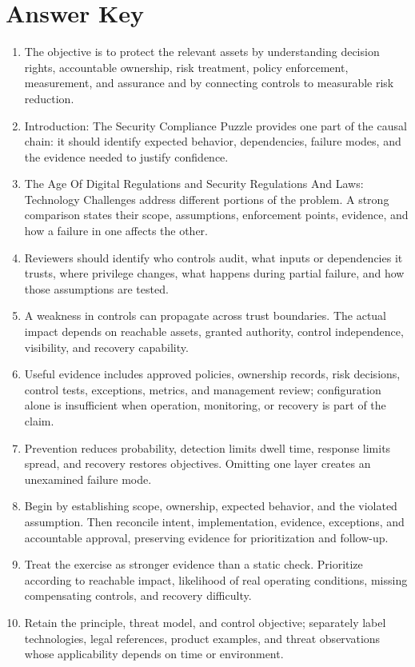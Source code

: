 \documentclass[11pt,letterpaper]{article}
\begin{document}
\section*{Answer Key}
\begin{enumerate}
\item The objective is to protect the relevant assets by understanding decision rights, accountable ownership, risk treatment, policy enforcement, measurement, and assurance and by connecting controls to measurable risk reduction.
\item Introduction: The Security Compliance Puzzle provides one part of the causal chain: it should identify expected behavior, dependencies, failure modes, and the evidence needed to justify confidence.
\item The Age Of Digital Regulations and Security Regulations And Laws: Technology Challenges address different portions of the problem. A strong comparison states their scope, assumptions, enforcement points, evidence, and how a failure in one affects the other.
\item Reviewers should identify who controls audit, what inputs or dependencies it trusts, where privilege changes, what happens during partial failure, and how those assumptions are tested.
\item A weakness in controls can propagate across trust boundaries. The actual impact depends on reachable assets, granted authority, control independence, visibility, and recovery capability.
\item Useful evidence includes approved policies, ownership records, risk decisions, control tests, exceptions, metrics, and management review; configuration alone is insufficient when operation, monitoring, or recovery is part of the claim.
\item Prevention reduces probability, detection limits dwell time, response limits spread, and recovery restores objectives. Omitting one layer creates an unexamined failure mode.
\item Begin by establishing scope, ownership, expected behavior, and the violated assumption. Then reconcile intent, implementation, evidence, exceptions, and accountable approval, preserving evidence for prioritization and follow-up.
\item Treat the exercise as stronger evidence than a static check. Prioritize according to reachable impact, likelihood of real operating conditions, missing compensating controls, and recovery difficulty.
\item Retain the principle, threat model, and control objective; separately label technologies, legal references, product examples, and threat observations whose applicability depends on time or environment.
\end{enumerate}
\end{document}
